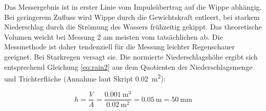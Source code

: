Das Messergebnis ist in erster Linie vom Impulsübertrag auf die Wippe abhängig. Bei geringerem Zufluss wird Wippe durch die Gewichtskraft entleert, bei starkem Niederschlag durch die Strömung des Wassers frühzeitig gekippt. Das theoretische Volumen weicht bei Messung 2 am meisten vom tatsächlichen ab. Die Messmethode ist daher tendenziell für die Messung leichter Regenschauer geeignet. Bei Starkregen versagt sie. 
Die normierte Niederschlagshöhe ergibt sich entsprechend Gleichung \ref{eq:rain2} aus dem Quotienten der Niederschlagsmenge und Trichterfläche (Annahme laut Skript \SI{0,02}{\square\meter}):

\begin{equation}
	\label{eq:rain2}
	h = \frac{V}{A} = \frac{\SI{0,001}{\cubic\meter}}{\SI{0,02}{\square\meter}} = \SI{0,05}{\meter} = \SI{50}{\milli\meter}
\end{equation}


